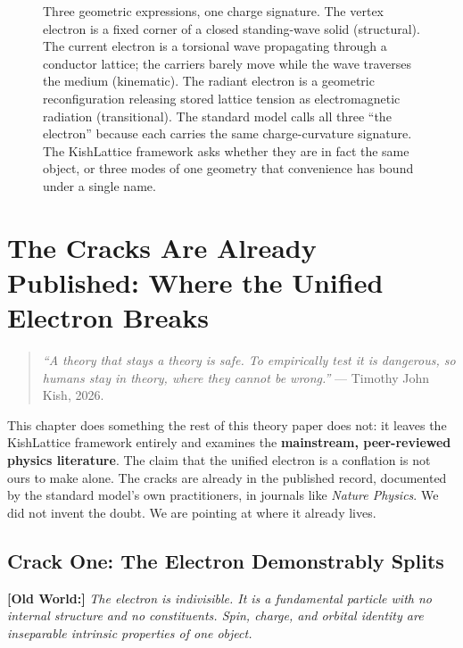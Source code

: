 \documentclass[11pt, letterpaper, openany]{book}
\newcommand{\oldworld}[1]{\noindent\textbf{\color{goldseal}[Old World:]}
  \textit{#1}\medskip}
\begin{document}
\begin{figure}[H]
\begin{tikzpicture}[scale=1.0]
\end{tikzpicture}
\caption{Three geometric expressions, one charge signature. The vertex
electron is a fixed corner of a closed standing-wave solid (structural).
The current electron is a torsional wave propagating through a conductor
lattice; the carriers barely move while the wave traverses the medium
(kinematic). The radiant electron is a geometric reconfiguration releasing
stored lattice tension as electromagnetic radiation (transitional). The
standard model calls all three ``the electron'' because each carries the
same charge-curvature signature. The KishLattice framework asks whether
they are in fact the same object, or three modes of one geometry that
convenience has bound under a single name.}
\end{figure}
 
\clearpage
 
\chapter{The Cracks Are Already Published: Where the Unified Electron Breaks}
 
\begin{quote}
\textit{``A theory that stays a theory is safe. To empirically test it is
dangerous, so humans stay in theory, where they cannot be wrong.''}
--- Timothy John Kish, 2026.
\end{quote}
 
This chapter does something the rest of this theory paper does not: it
leaves the KishLattice framework entirely and examines the
\textbf{mainstream, peer-reviewed physics literature}. The claim that the
unified electron is a conflation is not ours to make alone. The cracks are
already in the published record, documented by the standard model's own
practitioners, in journals like \emph{Nature Physics}. We did not invent
the doubt. We are pointing at where it already lives.
 
\section{Crack One: The Electron Demonstrably Splits}
 
\oldworld{The electron is indivisible. It is a fundamental particle with
no internal structure and no constituents. Spin, charge, and orbital
identity are inseparable intrinsic properties of one object.}
 
\end{document}
